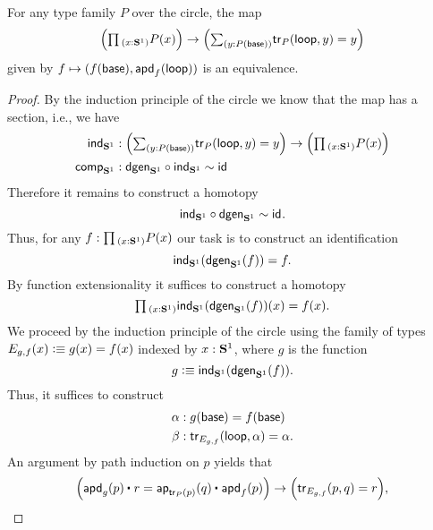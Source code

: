 \begin{thm}\label{thm:circle-dependent-universal-property}
  For any type family $P$ over the circle, the map
  \begin{equation*}
    \Big(\prd{x:\sphere{1}}P(x)\Big)
    \to
    \Big(\sm{y:P(\base)}\tr_P(\lloop,y)=y\Big)
  \end{equation*}
  given by $f\mapsto(f(\mathsf{base}),\mathsf{apd}_{f}\mathopen{}\left(\mathsf{loop}\right)\mathclose{})$ is an equivalence.
\end{thm}

\begin{proof}
  By the induction principle of the circle we know that the map has a section, i.e., we have
  \begin{align*}
    \ind{\sphere{1}} & : \Big(\sm{y:P(\base)}\tr_P(\lloop,y)=y\Big) \to \Big(\prd{x:\sphere{1}}P(x)\Big) \\
    \comphtpy{\sphere{1}} & : \dgen_{\sphere{1}}\circ\ind{\sphere{1}}\htpy\idfunc
  \end{align*}
  Therefore it remains to construct a homotopy
  \begin{equation*}
    \mathsf{ind}_{\mathbf{S}^{1}}\circ\mathsf{dgen}_{\mathbf{S}^{1}}\sim\mathsf{id}_{}.
  \end{equation*}
  Thus, for any $f:\prd{x:\sphere{1}}P(x)$ our task is to construct an identification
  \begin{equation*}
    \mathsf{ind}_{\mathbf{S}^{1}}(\mathsf{dgen}_{\mathbf{S}^{1}}(f))=f.
  \end{equation*}
  By function extensionality it suffices to construct a homotopy
  \begin{equation*}
    \prd{x:\sphere{1}} \ind{\sphere{1}}(\dgen_{\sphere{1}}(f))(x)= f(x).
  \end{equation*}
  We proceed by the induction principle of the circle using the family of types $E_{g,f}(x)\vcentcolon\equiv g(x)=f(x)$ indexed by $x:\mathbf{S}^{1}$, where $g$ is the function
  \begin{equation*}
    g\vcentcolon\equiv\mathsf{ind}_{\mathbf{S}^{1}}(\mathsf{dgen}_{\mathbf{S}^{1}}(f)).
  \end{equation*}
  Thus, it suffices to construct
  \begin{align*}
    \alpha & : g(\mathsf{base})=f(\mathsf{base})\\
    \beta  & : \mathsf{tr}_{E_{g,f}}(\mathsf{loop},\alpha)=\alpha. 
  \end{align*}
  An argument by path induction on $p$ yields that
  \begin{equation*}
    \Big(\ct{\apd{g}{p}}{r}=\ct{\ap{\tr_P(p)}{q}}{\apd{f}{p}}\Big)\to\Big(\tr_{E_{g,f}}(p,q)=r\Big),
  \end{equation*}

\end{proof}
